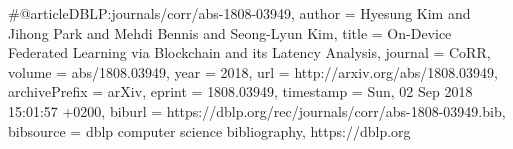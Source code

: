 #@article{DBLP:journals/corr/abs-1808-03949,
  author    = {Hyesung Kim and
               Jihong Park and
               Mehdi Bennis and
               Seong{-}Lyun Kim},
  title     = {On-Device Federated Learning via Blockchain and its Latency Analysis},
  journal   = {CoRR},
  volume    = {abs/1808.03949},
  year      = {2018},
  url       = {http://arxiv.org/abs/1808.03949},
  archivePrefix = {arXiv},
  eprint    = {1808.03949},
  timestamp = {Sun, 02 Sep 2018 15:01:57 +0200},
  biburl    = {https://dblp.org/rec/journals/corr/abs-1808-03949.bib},
  bibsource = {dblp computer science bibliography, https://dblp.org}
}

